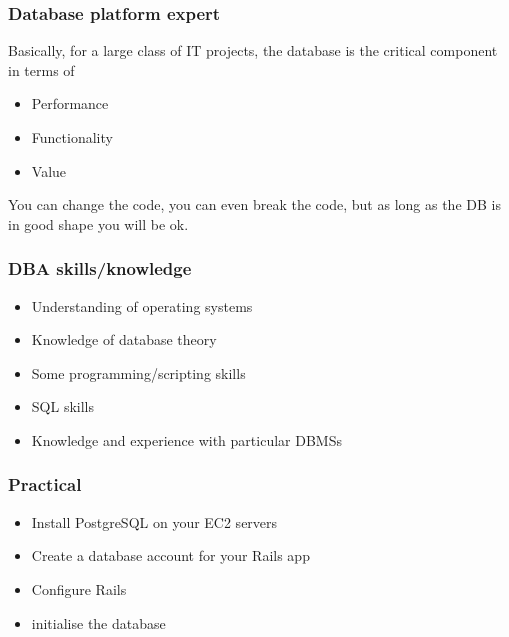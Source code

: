 \documentclass[10pt]{beamer}
\begin{document}
\begin{frame}
  \frametitle{Database platform expert}
 
  Basically, for a large class of IT projects, the database
  is the critical component in terms of 

 \begin{itemize}
  \item Performance
  \item Functionality
  \item Value
  \end{itemize}

  You can change the code, you can even break the code, but as long as the DB
  is in good shape you will be ok.
\end{frame}
\begin{frame}
  \frametitle{DBA skills/knowledge}
 
 \begin{itemize}
  \item Understanding of operating systems
  \item Knowledge of database theory
  \item Some programming/scripting skills
  \item SQL skills
  \item Knowledge and experience with particular DBMSs
  \end{itemize}

  

\end{frame}

\begin{frame}
  \frametitle{Practical}
 
 \begin{itemize}
  \item Install PostgreSQL on your EC2 servers
  \item Create a database account for your Rails app
  \item Configure Rails
  \item initialise the database
  \end{itemize}

  

\end{frame}
\end{document}
